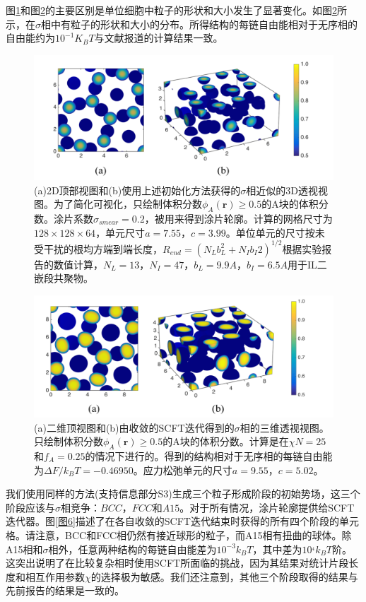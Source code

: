 \documentclass[12pt，a4paper]{article}
\numberwithin{equation}{section}
\begin{document}
图\ref{图4}和图\ref{图5}的主要区别是单位细胞中粒子的形状和大小发生了显著变化。如图\ref{图5}所示，在$\sigma$相中有粒子的形状和大小的分布。所得结构的每链自由能相对于无序相的自由能约为$10^{-1}K_BT$与文献报道的计算结果一致。
\begin{figure}[H]
\centering
\includegraphics[scale=0.5]{./figures/4.png}
\caption{(a)2D顶部视图和(b)使用上述初始化方法获得的$\sigma$相近似的3D透视视图。为了简化可视化，只绘制体积分数$\phi _A(\mathbf{r})\geq 0.5$的A块的体积分数。涂片系数$\sigma_{smear}=0.2$，被用来得到涂片轮廓。计算的网格尺寸为$128\times 128\times 64$，单元尺寸$a=7.55，c=3.99$。单位单元的尺寸按未受干扰的根均方端到端长度，$R_{end}=(N_L b_L^2 + N_I b_I 2)^{1/2}$根据实验报告的数值计算，$N_L=13，N_I=47，b_L=9.9A，b_I=6.5A$用于IL二嵌段共聚物。}
\label{图4}
\end{figure}

\begin{figure}[H]
\centering
\includegraphics[scale=0.5]{./figures/5.png}
\caption{(a)二维顶视图和(b)由收敛的SCFT迭代得到的$\sigma$相的三维透视视图。只绘制体积分数$\phi _A(\mathbf{r})\geq 0.5$的A块的体积分数。计算是在$\chi N=25$和$f_A=0.25$的情况下进行的。得到的结构相对于无序相的每链自由能为$\Delta F/k_BT=−0.46950$。应力松弛单元的尺寸$a=9.55，c=5.02$。}
\label{图5}
\end{figure}

我们使用同样的方法(支持信息部分S3)生成三个粒子形成阶段的初始势场，这三个阶段应该与$\sigma$相竞争：$BCC，FCC$和$A15$。对于所有情况，涂片轮廓提供给SCFT迭代器。图\ref{图6}描述了在各自收敛的SCFT迭代结束时获得的所有四个阶段的单元格。请注意，BCC和FCC相仍然有接近球形的粒子，而A15相有扭曲的球体。除A15相和$\sigma$相外，任意两种结构的每链自由能差为$10^{-3}k_BT$，其中差为$10^{_4}k_BT$阶。这突出说明了在比较复杂相时使用SCFT所面临的挑战，因为其结果对统计片段长度和相互作用参数$\chi$的选择极为敏感。我们还注意到，其他三个阶段取得的结果与先前报告的结果是一致的。
\end{document}
